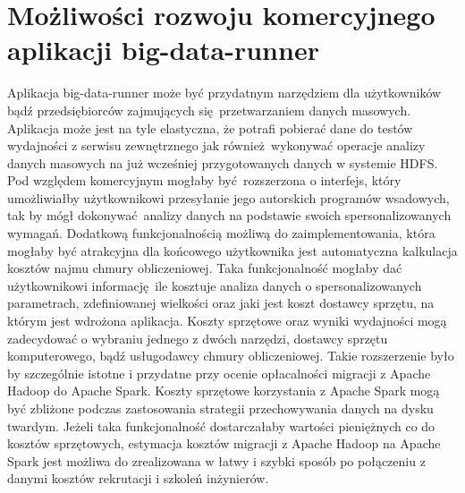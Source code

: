 \section{Możliwości rozwoju komercyjnego aplikacji big-data-runner}
Aplikacja big-data-runner może być przydatnym narzędziem dla użytkowników bądź przedsiębiorców zajmujących się przetwarzaniem danych masowych. Aplikacja może jest na tyle elastyczna, że potrafi pobierać dane do testów wydajności z serwisu zewnętrznego jak również wykonywać operacje analizy danych masowych na już wcześniej przygotowanych danych w systemie HDFS. Pod względem komercyjnym mogłaby być rozszerzona o interfejs, który umożliwiałby użytkownikowi przesyłanie jego autorskich programów wsadowych, tak by mógł dokonywać analizy danych na podstawie swoich spersonalizowanych wymagań. Dodatkową funkcjonalnością możliwą do zaimplementowania, która mogłaby być atrakcyjna dla końcowego użytkownika jest automatyczna kalkulacja kosztów najmu chmury obliczeniowej. Taka funkcjonalność mogłaby dać użytkownikowi informację ile kosztuje analiza danych o spersonalizowanych parametrach, zdefiniowanej wielkości oraz jaki jest koszt dostawcy sprzętu, na którym jest wdrożona aplikacja. Koszty sprzętowe oraz wyniki wydajności mogą zadecydować o wybraniu jednego z dwóch narzędzi, dostawcy sprzętu komputerowego, bądź usługodawcy chmury obliczeniowej. Takie rozszerzenie było by szczególnie istotne i przydatne przy ocenie opłacalności migracji z Apache Hadoop do Apache Spark. Koszty sprzętowe korzystania z Apache Spark mogą być zbliżone podczas zastosowania strategii przechowywania danych na dysku twardym. Jeżeli taka funkcjonalność dostarczałaby wartości pieniężnych co do kosztów sprzętowych, estymacja kosztów migracji z Apache Hadoop na Apache Spark jest możliwa do zrealizowana w łatwy i szybki sposób po połączeniu z danymi kosztów rekrutacji i szkoleń inżynierów. 